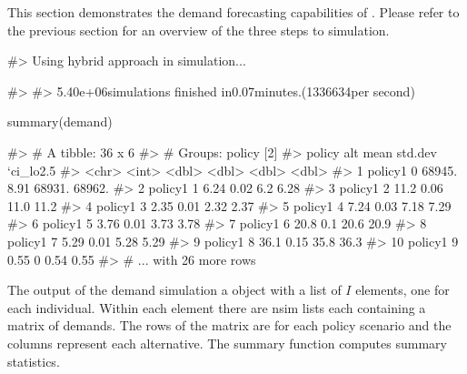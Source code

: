 This section demonstrates the demand forecasting capabilities of
. Please refer to the previous section for an overview of
the three steps to simulation.

\begin{Schunk}
\begin{Soutput}
#> Using hybrid approach in simulation...
\end{Soutput}
\begin{Soutput}
#> 
#> 5.40e+06simulations finished in0.07minutes.(1336634per second)
\end{Soutput}
\begin{Sinput}
summary(demand)
\end{Sinput}
\begin{Soutput}
#> # A tibble: 36 x 6
#> # Groups:   policy [2]
#>    policy    alt     mean std.dev `ci_lo2.5%` `ci_hi97.5%`
#>    <chr>   <int>    <dbl>   <dbl>       <dbl>        <dbl>
#>  1 policy1     0 68945.      8.91    68931.       68962.  
#>  2 policy1     1     6.24    0.02        6.2          6.28
#>  3 policy1     2    11.2     0.06       11.0         11.2 
#>  4 policy1     3     2.35    0.01        2.32         2.37
#>  5 policy1     4     7.24    0.03        7.18         7.29
#>  6 policy1     5     3.76    0.01        3.73         3.78
#>  7 policy1     6    20.8     0.1        20.6         20.9 
#>  8 policy1     7     5.29    0.01        5.28         5.29
#>  9 policy1     8    36.1     0.15       35.8         36.3 
#> 10 policy1     9     0.55    0           0.54         0.55
#> # ... with 26 more rows
\end{Soutput}
\end{Schunk}

The output of the demand simulation a  object with a
list of \(I\) elements, one for each individual. Within each element
there are nsim lists each containing a matrix of demands. The rows of
the matrix are for each policy scenario and the columns represent each
alternative. The summary function computes summary statistics.


